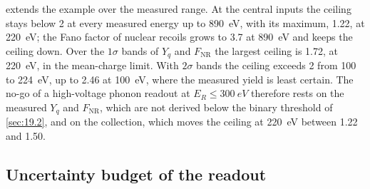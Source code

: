  extends the example over the measured range. At the central inputs the ceiling stays below 2 at every measured energy up to \SI{890}{eV}, with its maximum, 1.22, at \SI{220}{eV}; the Fano factor of nuclear recoils grows to 3.7 at \SI{890}{eV} and keeps the ceiling down. Over the $1\sigma$ bands of $Y_q$ and $F_{\mathrm{NR}}$ the largest ceiling is 1.72, at \SI{220}{eV}, in the mean-charge limit. With $2\sigma$ bands the ceiling exceeds 2 from 100 to \SI{224}{eV}, up to 2.46 at \SI{100}{eV}, where the measured yield is least certain. The no-go of a high-voltage phonon readout at $E_R \le \SI{300}{eV}$ therefore rests on the measured $Y_q$ and $F_{\mathrm{NR}}$, which are not derived below the binary threshold of \cref{sec:19.2}, and on the collection, which moves the ceiling at \SI{220}{eV} between 1.22 and 1.50.

\subsection{Uncertainty budget of the readout}\label{sec:20.5-budget}

